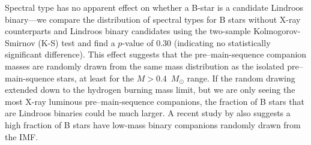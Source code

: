 \documentclass[twocolumn,tighten]{aastex61}
\begin{document}
Spectral type has no apparent effect on whether a B-star is a candidate Lindroos binary---we compare the distribution of spectral types for B stars without X-ray counterparts and Lindroos binary candidates using the two-sample Kolmogorov-Smirnov (K-S) test and find a $p$-value of 0.30 (indicating no statistically significant difference). This effect suggests that the pre--main-sequence companion masses are randomly drawn from the same mass distribution as the isolated pre--main-squence stars, at least for the $M>0.4$~$M_\odot$ range. If the random drawing extended down to the hydrogen burning mass limit, but we are only seeing the most X-ray luminous pre--main-sequence companions, the fraction of B stars that are Lindroos binaries could be much larger. A recent study by \citet{2016arXiv160605347M} also suggests a high fraction of B stars have low-mass binary companions randomly drawn from the IMF. 
\end{document}
